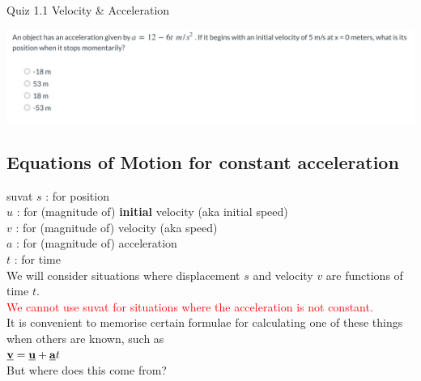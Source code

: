 \begin{frame}{Quiz 1.1 Velocity \& Acceleration}

\includegraphics[scale=0.35]{at}
\vspace{6cm}
\end{frame}



\subsection{Equations of Motion for constant acceleration}
\begin{frame}{suvat}
$s$ : for position \\
$u$ : for (magnitude of) \textbf{initial} velocity (aka initial speed)\\
$v$ : for (magnitude of) velocity (aka speed)\\
$a$ : for (magnitude of) acceleration\\
$t$ : for time \\[1ex]

We will consider situations where displacement $s$ and velocity $v$ are functions of time $t$.\\[1ex]

\textcolor{red}{We cannot use suvat for situations where the acceleration is not constant.}\\[1ex]

It is convenient to memorise certain formulae for calculating one of these things when others are known, such as \\[1ex]

 $\underline{\mathbf{v}} = \underline{\mathbf{u}} + \underline{\mathbf{a}}t$ \\[1ex]

But where does this come from?

\end{frame}



